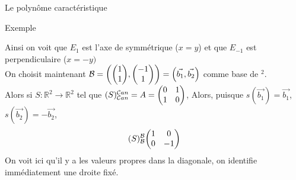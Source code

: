 \begin{parag}{Le polynôme caractéristique}
\begin{subparag}{Exemple}
\begin{itemize}
        \end{itemize}
        Ainsi on voit que $E_1$ est l'axe de symmétrique ($x =y$) et que $E_{-1}$ est perpendiculaire ($x = -y)$
        \\
        On choisit maintenant $\bmath = \left(\begin{pmatrix}
            1 \\ 1
        \end{pmatrix}, \begin{pmatrix}
            -1 \\ 1
        \end{pmatrix}\right) = \left(\vec{b_1}, \vec{b_2}\right)$ comme base de \R$^2$.
        \\
        Alors si $S : \mathbb{R}^2 \to \mathbb{R}^2 $ tel que $(S)_{\mathcal{C} an}^{\mathcal{C} an} = A = \begin{pmatrix}
            0 & 1 \\ 1 & 0
        \end{pmatrix}$, Alors, puisque $s(\vec{b_1})= \vec{b_1}$, $s(\vec{b_2}) = -\vec{b_2}$,
        \[(S)_\bmath^\bmath  \begin{pmatrix}
            1 & 0 \\ 0 & -1
        \end{pmatrix}\]
        On voit ici qu'il y a les valeurs propres dans la diagonale, on identifie immédiatement une droite fixé.
    \end{subparag}
    
\end{parag}


